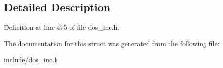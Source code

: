 \subsection{Detailed Description}


Definition at line 475 of file dos\-\_\-inc.\-h.



The documentation for this struct was generated from the following file\-:\begin{DoxyCompactItemize}
\item 
include/dos\-\_\-inc.\-h\end{DoxyCompactItemize}
